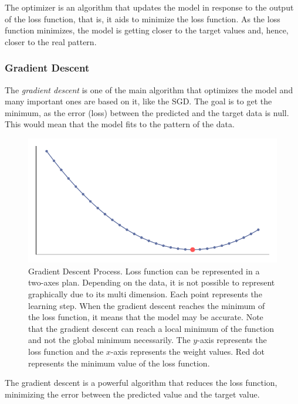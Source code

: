 The optimizer is an algorithm that updates the model in response to the output of the loss function, that is, it aids to minimize the loss function. 
As the loss function minimizes, the model is getting closer to the target values and, hence, closer to the real pattern.

\subsubsection*{Gradient Descent} 

The \emph{gradient descent} is one of the main algorithm \cite{nesterov2004} that optimizes the model and many important ones are based on it, like the SGD. 
The goal is to get the minimum, as the error (loss) between the predicted and the target data is null. 
This would mean that the model fits to the pattern of the data.
%
\begin{figure}[!htb]
    \centering
    \caption[Gradient Descent Process]{Gradient Descent Process. Loss function can be represented in a two-axes plan. Depending on the data, it is not possible to represent graphically due to its multi dimension. Each point represents the learning step. When the gradient descent reaches the minimum of the loss function, it means that the model may be accurate. Note that the gradient descent can reach a local minimum of the function and not the global minimum necessarily. The \(y\)-axis represents the loss function and the \(x\)-axis represents the weight values. Red dot represents the minimum value of the loss function.}
    \includegraphics{figures/2review/nn/gradient_descent.pdf}
    
    
\end{figure}

The gradient descent is a powerful algorithm that reduces the loss function, minimizing the error between the predicted value and the target value.


